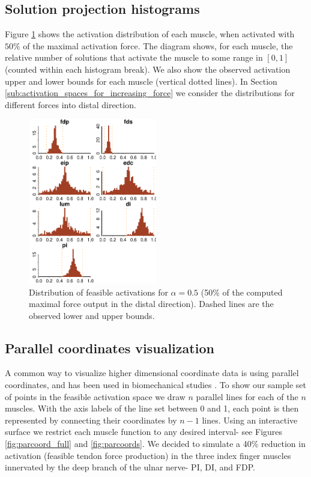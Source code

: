 \subsection*{Solution projection histograms}
Figure \ref{fig:raw_histograms} shows the activation distribution of each muscle, when activated with $50\%$ of the maximal activation force. The diagram shows, for each muscle, the relative number of solutions that activate the muscle to some range in $[0,1]$ (counted within each histogram break).
We also show the observed activation upper and lower bounds for each muscle (vertical dotted lines).
In Section \ref{sub:activation_spaces_for_increasing_force} we consider the distributions for different forces into distal direction.
\begin{figure}[h]
\centering
\includegraphics[width=0.5\textwidth]{figs/raw_histograms.pdf}
\caption{Distribution of feasible activations for $\alpha= 0.5$ (50\% of the computed maximal force output in the distal direction). Dashed lines are the observed lower and upper bounds.}
\label{fig:raw_histograms}
\end{figure}

\subsection*{Parallel coordinates visualization}
A common way to visualize higher dimensional coordinate data is using parallel coordinates, and has been used in biomechanical studies \cite{bachynskyi2013biomechanical, krekel2010visual}.
To show our sample set of points in the feasible activation space we draw $n$ parallel lines for each of the $n$ muscles.
With the axis labels of the line set between 0 and 1, each point is then represented by connecting their coordinates by $n-1$ lines.
Using an interactive surface we restrict each muscle function to any desired interval- see Figures \ref{fig:parcoord_full} and \ref{fig:parcoords}.
We decided to simulate a 40\% reduction in activation (feasible tendon force production) in the three index finger muscles innervated by the deep branch of the ulnar nerve- PI, DI, and FDP. 

